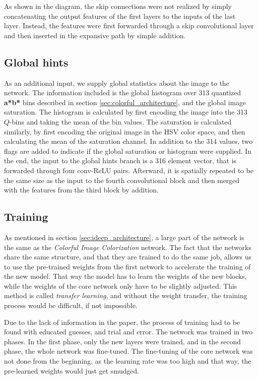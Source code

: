 As shown in the diagram, the skip connections were not realized by simply concatenating
the output features of the first layers to the inputs of the last layer. Instead, 
the features were first forwarded through a skip convolutional layer and then inserted
in the expansive path by simple addition.

\subsection{Global hints}
\label{sec:global}

As an additional input, we supply global statistics about the image to the network. The 
information included is the global histogram over 313 quantized \textbf{a*b*} bins 
described in section \ref{sec:colorful_architecture}, and the global image saturation. 
The histogram is calculated by first encoding the image into the 313 $Q$-bins and taking 
the mean of the bin values. The saturation is calculated similarly, by first 
encoding the original image in the HSV color space, and then calculating the mean of the
saturation channel. In addition to the 314 values, two flags are added to indicate 
if the global saturation or histogram were supplied. In the end, the input to the 
global hints branch is a 316 element vector, that is forwarded through four 
conv-ReLU pairs. Afterward, it is spatially repeated to be the same size as the input
to the fourth convolutional block and then merged with the features from the third
block by addition.

\subsection{Training}

As mentioned in section \ref{sec:ideep_architecture}, a large part of the network 
is the same as the \textit{Colorful Image Colorization} network. The fact that the 
networks share the same structure, and that they are trained to do the same job, allows 
us to use the pre-trained weights from the first network to accelerate the training of 
the new model. That way the model has to learn the weights of the new blocks, while 
the weights of the core network only have to be slightly adjusted. This method is 
called \textit{transfer learning}, and without the weight transfer, the training 
process would be difficult, if not impossible.

Due to the lack of information in the paper, the process of training had to be 
found with educated guesses, and trial and error. The network was trained in two phases. 
In the first phase, only the new layers were trained, and in the second phase, the whole 
network was fine-tuned. The fine-tuning of the core network was not done from the beginning, 
as the learning rate was too high and that way, the pre-learned weights would just get smudged.

